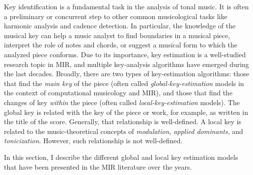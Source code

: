 

Key identification is a fundamental task in the analysis of
tonal music. It is often a preliminary or concurrent step to
other common musicological tasks like harmonic analysis and
cadence detection. In particular, the knowledge of the
musical key can help a music analyst to find boundaries in a
musical piece, interpret the role of notes and chords, or
suggest a musical form to which the analyzed piece conforms.
Due to its importance, key estimation is a well-studied
research topic in MIR, and multiple key-analysis algorithms
have emerged during the last decades. Broadly, there are two
types of key-estimation algorithms: those that find the
\emph{main key} of the piece (often called
\emph{global-key-estimation} models in the context of
computational musicology and MIR), and those that find the
changes of key \emph{within} the piece (often called
\emph{local-key-estimation} models). The global key is
related with the key of the piece or work, for example, as
written in the title of the score. Generally, that
relationship is well-defined. A local key is related to the
music-theoretical concepts of \emph{modulation},
\emph{applied dominants}, and \emph{tonicization}. However,
such relationship is not well-defined.

In this section, I describe the different global and local key estimation models that have been presented in the MIR literature over the years.

